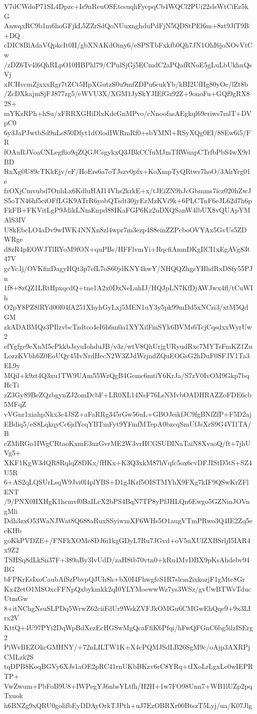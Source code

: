 V7dCWdoP71SL4Dpzc+Is9nReuOSEtcsuqhFyepqCb4WQCl2PUi22slsWtCiEz5kG
AnwqxRC9b1m6hoGFjkL5ZZrSdQoNUuxnghduPdFjN5QDStPEl6m+8zt9JfT9B+DQ
cDIC8BlAdaVQpkcIt0H/gbXNAKdOiny6/eSPSTbFxkfb0Qh7JN1OhI6joNOvVtCw
/zDZ6Tv4l6QhRLpO10HBPhl79/CPulSjGj5ECmdC2aPQafRNoE5gLuLbUkhnQsVj
xICHvcmZjxxxRgr7tZCt5HpXGutzS0u9mfZDPu6cukYb/kBI2UfHg80yOe/lZt8b
/ZcDXkajmSjFJ877zg5/eWVU3X/XGM1JySkYJIEfGz92Z+9onoFu+GQf9gRX82S+
mYKzRPh+hSu/xFRRXGHiDlxKdeGnMPvo/cNnoofasAEgkql69eriws7mlT+DVpC0
6y3JaPJwtbSd9nLs850Dfyt1dOlodIWRmRf0+sbYMNl+RSyXQg0EI/88Ew6i5/FR
fOAuRJVoaCNLegflio9qZQGJCsgykxQ3JBkCCfuMJmTRWuapCTrfbPbS4wX9rlBD
RxXg0U89cTKkEjv/eF/HoErs6a7oTJszv0pfx+KoXmpTyQRtws7hoO/3AhYrg01e
fzOXjCmvubd7OnhLx6KdluHAI14Vhs2krkE+x/tJEiZN9hJcGbmms7icz020hZwJ
S5oTN46hf5eiOFfLGK9ATrR6yobQTsdt30jyEzMzKVi9k+6PLCTnF6eJL62d7h6p
FkFB+FKVitLgP9JdikLNmEnpd88IKaFGP6Kz2uDXQSanW4lbUX8vQUApYMAlS3IV
U8kEbcLO4aDv9wIWK4NNXn8zl4wpr7m3ezp4S8einZZPcboOVYAx5GvUs5ZDWRge
d8zR4pEOWJTlRYoM9fON+quPBs/HFFlvmYi+RqcfiAmnDKgIlCI1xEgAVg83t47V
gcYcJj/OVKfinDagyHQt3p7efL7oS60jdKNY4kwY/NHQQZhgsYHhdRxDSfy55PJn
1f8+8zQZ1LRtHpxqcdQ+tne1A2x0DxNeLuhIJ/HQJpLN7KfDjAWJwx4fl/tCuWIh
O2pY8PZ8lRYd00l04fA251XhyhGyLxj5MEN1uY3y5pk99mDd5xNCzi3/xtM5QdGM
zkADABMQz3PIlzvbcTzdtco4eI6h6m0a1XYXilFmSYk6BVMs6TcjCqsdxxWyrUw2
efYgfge9eXnM5cPkkbJsyuIohduJB/v3z/wtV8QhUrjgURyudRxc7MYTsFmKZ1Zu
LozzKVbh6Z0EoUQy45IvNrdHecN2W3ZJdWzjndZQuEOGsG2hDuF0SFJV1Ta3EL9y
MQil+k9zt4Q3xu1TW9UAm55WzQgB4Gemc6mtiY6KrJa/S7zV0IvOM9Gkp7bqHcTi
zZ3Gy89BeZQzbgynZJ2omDcbF+LR0XL14NsF76LsNMvbOADHRAZZoFDE6cb5MFqZ
vVGnr1xiahpNkx3c4JSZ+aFaRRg345rGw56uL+GBOJeikfJC9fgBNfZfP+F5D2aj
EBdiq5/eS8LqkqyCc6jdYcqYBTmFyt9YFmfMTepA0bzcqSmUfJsXrS9G4VI1TA/B
eZMiRGo1IWgCRtaoKxmE3uzGvrME2W3vrHCGSUDINaTaiN8XvaoQ/ft+7jhUVg5+
XKF1KgW3dQR8RqlqZ8DKx/fHKx+K3Q3xkM87hVqfc5ox6cvDFJIStD5tS+SZ4U5R
6+AS2qLQSUrLsqW9Jvi0l4plYBS+D1gJKrf5OISTMYhX9FXg7kIF9QSwKrZFlENT
/9/PNX0HXHgK1hcmvf0BaILcX2bPS4BqN7TP8yPfJHLQn6Ewgo5GZNinJOVngMli
Ddh3zxO53WaNJWat8Q688aRuxSSyiwmXF6WHs5O1augVTmPRwo3Q4IE2Zq5eeKHb
goKkPVDZE+/FNFkXOMe8DJ6i1kgGDyL7Ru7JGvd+oV5nXUlZXBSrljI5IAR4x9Z2
TSHSq8dLkSn37F+389aBy3IvUdD/zaH8tb70vtn0+kRu4MvDBX9pKsAhdebv94BG
bFPKrEsIxoCaubAfSzPbvpQJUh8h+bX0I4FhwgfcS1R7slcm2ixkozjF1gMtc8Gr
Kx42etO1MSOxcFFNpQxbykmkk2qI0YLYMoewwWz7ys3WSz/gvUwBTWvTducUtmGw
8+itNChgNsuSLPDq5WrwZ62ciiFdUr9WskZVFJkOMGu6CMGwEhQqe9+9x3LIrx2V
KttQ+4U97PYi2DqWpBdXezEcHGSwMgQcaFfiK6Pfqi/hFwQFGnC6bg5ilzISErg2
PiWvBEZOkcGMHNY/+72nLILTW1K+X4cPQMJSdLB26SgM9c/oAjp3AXRPjCMLzk2S
tqDPB8KoqBGVy6XJs1aOE2pRC41rnUKbBKzv6rC8YRq+tIXoLrLgxLc0wIEPRTP+
VwZwum+PbFoB9U8+IWPegYJ6nbsYLtfh/H2H+1w7FO98Unn7+WB1lUZp2pqTxuok
h6BNZg9xQRU0golifbEyDDAyOrkTJPth+uJ7EzOBRXr00BtszT5Lyj/ua/K07Jlg

